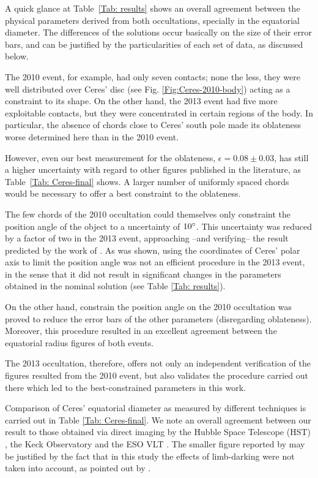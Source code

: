 \documentclass[useAMS,usenatbib]{mn2e}
\begin{document}
A quick glance at Table~\ref{Tab: results} shows an overall agreement between the physical parameters derived from both occultations, specially in the equatorial diameter. The differences of the solutions occur basically on the size of their error bars, and can be justified by the particularities of each set of data, as discussed below. 

The 2010 event, for example, had only seven contacts; none the less, they were well distributed over Ceres' disc (see Fig. \ref{Fig:Ceres-2010-body}) acting as a constraint to its shape. On the other hand, the 2013 event had five more exploitable contacts, but they were concentrated in certain regions of the body. In particular, the absence of chords close to Ceres' south pole made its oblateness worse determined here than in the 2010 event.

However, even our best measurement for the oblateness, $\epsilon=0.08 \pm 0.03$, has still a higher uncertainty with regard to other figures published in the literature, as Table~\ref{Tab: Ceres-final} shows. A larger number of uniformly spaced chords would be necessary to offer a best constraint to the oblateness. 

The few chords of the 2010 occultation could themselves only constraint the position angle of the object to a uncertainty of $10\hbox{$^\circ$}$. This uncertainty was reduced by a factor of two in the 2013 event, approaching --and verifying-- the result predicted by the work of \cite{Drummond2014}. As was shown, using the coordinates of Ceres' polar axis to limit the position angle was not an efficient procedure in the 2013 event, in the sense that it did not result in significant changes in the parameters obtained in the nominal solution (see Table \ref{Tab: results}).

On the other hand, constrain the position angle on the 2010 occultation was proved to reduce the error bars of the other parameters (disregarding oblateness). Moreover, this procedure resulted in an excellent agreement between the equatorial radius figures of both events.

The 2013 occultation, therefore, offers not only an independent verification of the figures resulted from the 2010 event, but also validates the procedure carried out there which led to the best-constrained parameters in this work.

Comparison of Ceres' equatorial diameter as measured by different techniques is carried out in Table \ref{Tab: Ceres-final}. We note an overall agreement between our result to those obtained via direct imaging by the Hubble Space Telescope (HST) \citep{Thomas2005}, the Keck Observatory and the ESO VLT \citep{Drummond2014}. The smaller figure reported by \cite{Carry2008} may be justified by the fact that in this study the effects of limb-darking were not taken into account, as pointed out by \cite{Drummond2014}.
\end{document}

